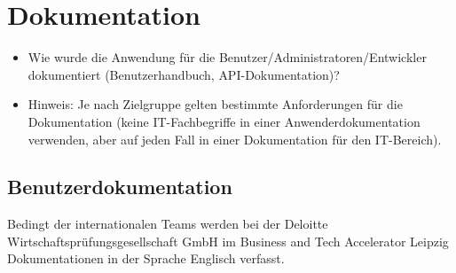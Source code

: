 \section{Dokumentation}
\label{sec:Dokumentation}

\begin{itemize}
	\item Wie wurde die Anwendung für die Benutzer/Administratoren/Entwickler dokumentiert (\zB Benutzerhandbuch, \acs{API}-Dokumentation)?
	\item Hinweis: Je nach Zielgruppe gelten bestimmte Anforderungen für die Dokumentation (\zB keine IT-Fachbegriffe in einer Anwenderdokumentation verwenden, aber auf jeden Fall in einer Dokumentation für den IT-Bereich).
\end{itemize}

\subsection{Benutzerdokumentation}
\label{sec:Benutzerdokumentation}
Bedingt der internationalen Teams werden bei der Deloitte Wirtschaftsprüfungsgesellschaft GmbH im \acs{Business and Tech Accelerator Leipzig} Dokumentationen in der 
Sprache Englisch verfasst.
